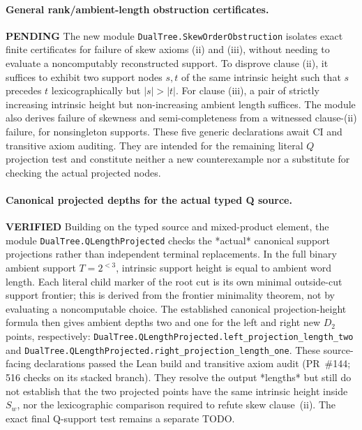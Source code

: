 \documentclass[11pt]{article}
\newcommand{\ok}{\textcolor{green!40!black}{\textbf{VERIFIED}}}
\newcommand{\todo}{\textcolor{gray!70!black}{\textbf{PENDING}}}
\newcommand{\lean}[1]{\texttt{#1}}
\begin{document}
\paragraph{General rank/ambient-length obstruction certificates.} \todo
The new module \lean{DualTree.SkewOrderObstruction} isolates exact
finite certificates for failure of skew axioms (ii) and (iii),
without needing to evaluate a noncomputably reconstructed support.
To disprove clause (ii), it suffices to exhibit two support nodes
$s,t$ of the same intrinsic height such that $s$ precedes $t$
lexicographically but $|s|>|t|$. For clause (iii), a pair
of strictly increasing intrinsic height but non-increasing
ambient length suffices. The module also derives failure of
skewness and semi-completeness from a witnessed clause-(ii)
failure, for nonsingleton supports.
These five generic declarations await CI and transitive axiom
auditing. They are intended for the remaining literal $Q$
projection test and constitute neither a new counterexample
nor a substitute for checking the actual projected nodes.

\paragraph{Canonical projected depths for the actual typed Q source.} \ok
Building on the typed source and mixed-product element, the module
\lean{DualTree.QLengthProjected} checks the *actual* canonical
support projections rather than independent terminal replacements.
In the full binary ambient support $T=2^{<3}$, intrinsic support
height is equal to ambient word length.  Each literal child
marker of the root cut is its own minimal outside-cut support
frontier; this is derived from the frontier minimality theorem,
not by evaluating a noncomputable choice. The established canonical
projection-height formula then gives ambient depths two and one
for the left and right new $D_2$ points, respectively:
\lean{DualTree.QLengthProjected.left_projection_length_two}
and \lean{DualTree.QLengthProjected.right_projection_length_one}.
These source-facing declarations passed the Lean build and transitive
axiom audit (PR~\#144; 516 checks on its stacked branch).
They resolve the output *lengths* but still do not establish that
the two projected points have the same intrinsic height inside
$S_w$, nor the lexicographic comparison required to refute skew
clause~(ii). The exact final Q-support test remains a separate TODO.
\end{document}
